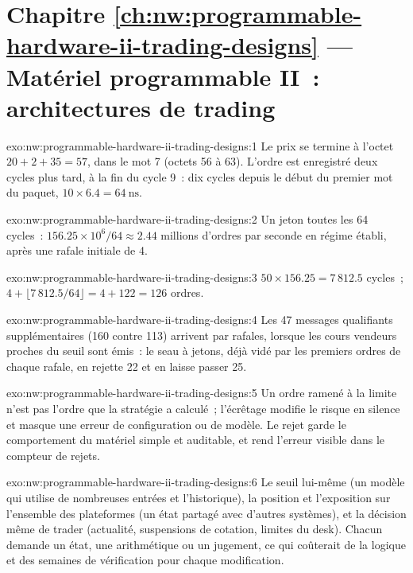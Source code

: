 \section*{Chapitre \ref{ch:nw:programmable-hardware-ii-trading-designs} --- Matériel programmable II~: architectures de trading}

\begin{solution}{exo:nw:programmable-hardware-ii-trading-designs:1}
Le prix se termine à l'octet $20 + 2 + 35 = 57$, dans le mot 7 (octets 56 à 63). L'ordre est enregistré deux cycles plus tard, à la fin du cycle 9~:
dix cycles depuis le début du premier mot du paquet, $10 \times 6.4 = \qty{64}{\nano\second}$.
\end{solution}

\begin{solution}{exo:nw:programmable-hardware-ii-trading-designs:2}
Un jeton toutes les 64 cycles~: $156.25 \times 10^6 / 64 \approx 2.44$ millions d'ordres par seconde en régime établi, après une rafale initiale de 4.
\end{solution}

\begin{solution}{exo:nw:programmable-hardware-ii-trading-designs:3}
$50 \times 156.25 = 7\,812.5$ cycles~; $4 + \lfloor 7\,812.5 / 64\rfloor = 4 + 122 = 126$ ordres.
\end{solution}

\begin{solution}{exo:nw:programmable-hardware-ii-trading-designs:4}
Les 47 messages qualifiants supplémentaires (160 contre 113) arrivent par rafales, lorsque les cours vendeurs proches du seuil sont émis~: le seau à jetons, déjà
vidé par les premiers ordres de chaque rafale, en rejette 22 et en laisse passer 25.
\end{solution}

\begin{solution}{exo:nw:programmable-hardware-ii-trading-designs:5}
Un ordre ramené à la limite n'est pas l'ordre que la stratégie a calculé~; l'écrêtage modifie le risque en silence et masque une erreur de configuration ou de modèle.
Le rejet garde le comportement du matériel simple et auditable, et rend l'erreur visible dans le compteur de rejets.
\end{solution}

\begin{solution}{exo:nw:programmable-hardware-ii-trading-designs:6}
Le seuil lui-même (un modèle qui utilise de nombreuses entrées et l'historique), la position et l'exposition sur l'ensemble des plateformes (un état partagé avec d'autres systèmes),
et la décision même de trader (actualité, suspensions de cotation, limites du desk). Chacun demande un état, une arithmétique ou un jugement, ce qui coûterait de la logique et des semaines de
vérification pour chaque modification.
\end{solution}

